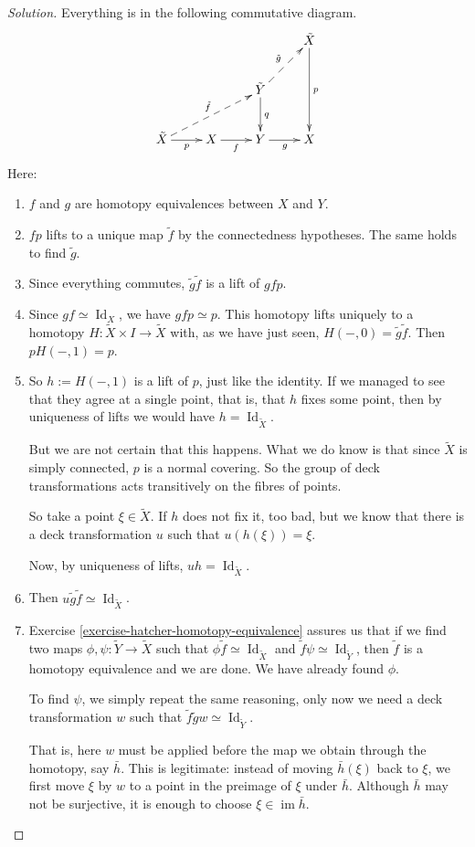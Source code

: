 \begin{proof}[Solution]
Everything is in the following commutative
diagram.
$$
\xymatrix{
  &&& \tilde{X} \ar[dd]^{p} \\
  && \tilde{Y} \ar[d]^{q}
     \ar@{-->}[ur]^{\tilde{g}} \\
\tilde{X} \ar@{-->}[urr]^{\tilde{f}}
  \ar[r]_{p}
  & X \ar[r]_{f}
  & Y \ar[r]_{g}
  & X
}
$$
Here:
\begin{enumerate}
\item $f$ and $g$ are homotopy equivalences
between $X$ and $Y$.
\item $fp$ lifts to a unique map $\tilde{f}$
by the connectedness hypotheses. The same
holds to find $\tilde{g}$.
\item Since everything commutes,
$\tilde{g}\tilde{f}$ is a lift of $gfp$.
\item Since
$gf\simeq\operatorname{Id}_X$, we have
$gfp\simeq p$. This homotopy lifts uniquely
to a homotopy
$H:\tilde{X}\times I\to\tilde{X}$ with, as
we have just seen,
$H(-,0)=\tilde{g}\tilde{f}$. Then
$pH(-,1)=p$.
\item So $h:=H(-,1)$ is a lift of $p$, just
like the identity. If we managed to see that
they agree at a single point, that is, that
$h$ fixes some point, then by uniqueness of
lifts we would have
$h=\operatorname{Id}_{\tilde{X}}$.

But we are not certain that this happens.
What we do know is that since $\tilde{X}$ is
simply connected, $p$ is a normal covering.
So the group of deck transformations acts
transitively on the fibres of points.

So take a point $\xi\in\tilde{X}$. If $h$
does not fix it, too bad, but we know that
there is a deck transformation $u$ such that
$u(h(\xi))=\xi$.

Now, by uniqueness of lifts,
$uh=\operatorname{Id}_{\tilde{X}}$.
\item Then
$u\tilde{g}\tilde{f}\simeq
\operatorname{Id}_{\tilde{X}}$.
\item Exercise
\ref{exercise-hatcher-homotopy-equivalence}
assures us that if we find two maps
$\phi,\psi:\tilde{Y}\to\tilde{X}$ such that
$\phi\tilde{f}\simeq
\operatorname{Id}_{\tilde{X}}$
and
$\tilde{f}\psi\simeq
\operatorname{Id}_{\tilde{Y}}$,
then $\tilde{f}$ is a homotopy equivalence
and we are done. We have already found
$\phi$.

To find $\psi$, we simply repeat the same
reasoning, only now we need a deck
transformation $w$ such that
$\tilde{f}\tilde{g}w\simeq
\operatorname{Id}_{\tilde{Y}}$.

That is, here $w$ must be applied before the
map we obtain through the homotopy, say
$\bar{h}$. This is legitimate: instead of
moving $\bar{h}(\xi)$ back to $\xi$, we
first move $\xi$ by $w$ to a point in the
preimage of $\xi$ under $\bar{h}$. Although
$\bar{h}$ may not be surjective, it is
enough to choose
$\xi\in\operatorname{im}\bar{h}$.
\end{enumerate}
\end{proof}


